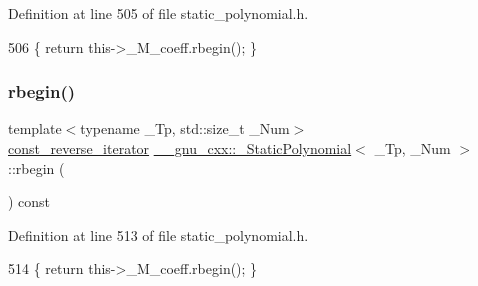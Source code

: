 Definition at line 505 of file static\+\_\+polynomial.\+h.


\begin{DoxyCode}
506       \{ \textcolor{keywordflow}{return} this->\_M\_coeff.rbegin(); \}
\end{DoxyCode}
\mbox{\label{class____gnu__cxx_1_1__StaticPolynomial_ae6737a13b22aa1f7289c9f3882fe0b62}} 
\subsubsection{\texorpdfstring{rbegin()}{rbegin()}\hspace{0.1cm}{\footnotesize\ttfamily [2/2]}}
{\footnotesize\ttfamily template$<$typename \+\_\+\+Tp, std\+::size\+\_\+t \+\_\+\+Num$>$ \\
\hyperlink{class____gnu__cxx_1_1__StaticPolynomial_a03b96649dc974fc6829342659325b7cb}{const\+\_\+reverse\+\_\+iterator} \hyperlink{class____gnu__cxx_1_1__StaticPolynomial}{\+\_\+\+\_\+gnu\+\_\+cxx\+::\+\_\+\+Static\+Polynomial}$<$ \+\_\+\+Tp, \+\_\+\+Num $>$\+::rbegin (\begin{DoxyParamCaption}{ }\end{DoxyParamCaption}) const\hspace{0.3cm}{\ttfamily [inline]}}



Definition at line 513 of file static\+\_\+polynomial.\+h.


\begin{DoxyCode}
514       \{ \textcolor{keywordflow}{return} this->\_M\_coeff.rbegin(); \}
\end{DoxyCode}
\mbox{\label{class____gnu__cxx_1_1__StaticPolynomial_a588b23e51d1ac50bee019f336193db38}} 
